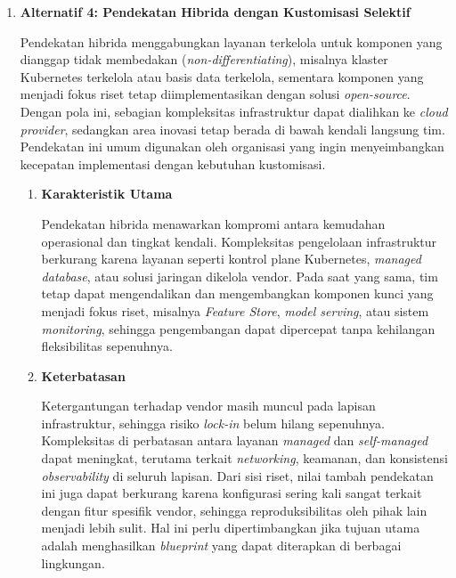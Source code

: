 \begin{enumerate}
    \item \textbf{Alternatif 4: Pendekatan Hibrida dengan Kustomisasi Selektif}

    Pendekatan hibrida menggabungkan layanan terkelola untuk komponen yang dianggap tidak membedakan (\textit{non-differentiating}), misalnya klaster Kubernetes terkelola atau basis data terkelola, sementara komponen yang menjadi fokus riset tetap diimplementasikan dengan solusi \textit{open-source}. Dengan pola ini, sebagian kompleksitas infrastruktur dapat dialihkan ke \textit{cloud provider}, sedangkan area inovasi tetap berada di bawah kendali langsung tim. Pendekatan ini umum digunakan oleh organisasi yang ingin menyeimbangkan kecepatan implementasi dengan kebutuhan kustomisasi.

    \vspace{0.5em}
    \begin{enumerate}[label=\alph*)]
        \item \textbf{Karakteristik Utama}

        Pendekatan hibrida menawarkan kompromi antara kemudahan operasional dan tingkat kendali. Kompleksitas pengelolaan infrastruktur berkurang karena layanan seperti kontrol plane Kubernetes, \textit{managed database}, atau solusi jaringan dikelola vendor. Pada saat yang sama, tim tetap dapat mengendalikan dan mengembangkan komponen kunci yang menjadi fokus riset, misalnya \textit{Feature Store}, \textit{model serving}, atau sistem \textit{monitoring}, sehingga pengembangan dapat dipercepat tanpa kehilangan fleksibilitas sepenuhnya.

        \vspace{0.5em}
        \item \textbf{Keterbatasan}

        Ketergantungan terhadap vendor masih muncul pada lapisan infrastruktur, sehingga risiko \textit{lock-in} belum hilang sepenuhnya. Kompleksitas di perbatasan antara layanan \textit{managed} dan \textit{self-managed} dapat meningkat, terutama terkait \textit{networking}, keamanan, dan konsistensi \textit{observability} di seluruh lapisan. Dari sisi riset, nilai tambah pendekatan ini juga dapat berkurang karena konfigurasi sering kali sangat terkait dengan fitur spesifik vendor, sehingga reproduksibilitas oleh pihak lain menjadi lebih sulit. Hal ini perlu dipertimbangkan jika tujuan utama adalah menghasilkan \textit{blueprint} yang dapat diterapkan di berbagai lingkungan.
    
        \vspace{0.5em}
    \end{enumerate}
\end{enumerate}

